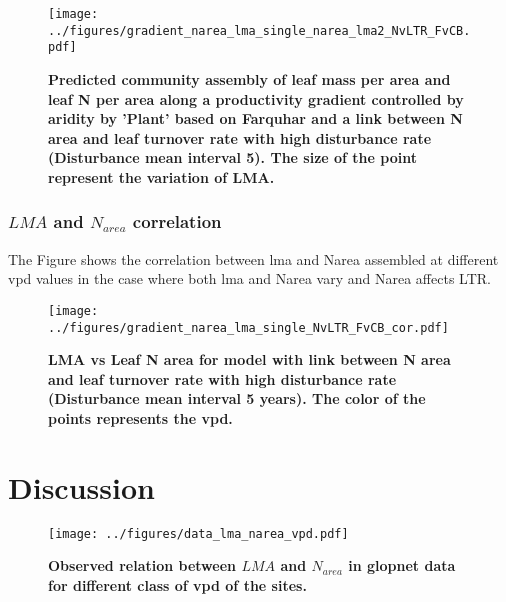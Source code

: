 \documentclass[a4paper,11pt]{article}
\begin{document}
\begin{figure}[H] 
\centering
\texttt{[image: ../figures/gradient\_narea\_lma\_single\_narea\_lma2\_NvLTR\_FvCB.pdf]}
\caption{\textbf{Predicted community assembly of leaf mass per area and leaf N per area along a productivity gradient controlled by aridity by 'Plant' based on Farquhar and a link between N area and leaf turnover rate with high disturbance rate (Disturbance mean interval 5). The size of the point represent the variation of LMA.}
\label{fig:lma_nareaFh2_NvLTR}}
\end{figure}


\subsubsection{$LMA$ and $N_{area}$ correlation}

The Figure \label{fig:lma_narea_cor_single_NvLTR} shows the correlation
between lma and Narea assembled at different
vpd values in the case where both lma and Narea vary and Narea affects
LTR.


\begin{figure}[H]
\centering
\texttt{[image: ../figures/gradient\_narea\_lma\_single\_NvLTR\_FvCB\_cor.pdf]}
\caption{\textbf{LMA vs Leaf N area for model with link between N area and leaf turnover rate with high disturbance rate (Disturbance mean interval 5 years). The color of the points represents the vpd.}
\label{fig:lma_narea_cor_single_NvLTR}}
\end{figure}

\pagebreak[4]


\section{Discussion}


\begin{figure}[H]
\centering
\texttt{[image: ../figures/data\_lma\_narea\_vpd.pdf]}
\caption{\textbf{Observed relation between $LMA$ and
    $N_{area}$ in glopnet data \citep{Wright-2004} for different class
    of vpd of the sites.}
\label{fig:lma_narea_glopnet}}
\end{figure}
\end{document}
